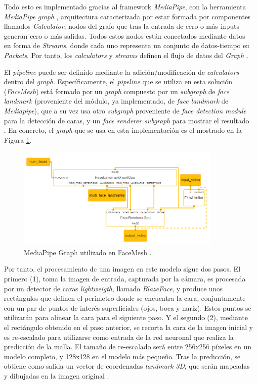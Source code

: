Todo esto es implementado gracias al framework \textit{MediaPipe}, con la herramienta \textit{MediaPipe graph} \cite{mediapipe}, arquitectura caracterizada por estar formada por componentes llamados \textit{Calculator}, nodos del grafo que tras la entrada de cero o más inputs generan cero o más salidas. Todos estos nodos están conectados mediante datos en forma de \textit{Streams}, donde cada uno representa un conjunto de datos-tiempo en \textit{Packets}. Por tanto, los \textit{calculators} y \textit{streams} definen el flujo de datos del \textit{Graph} \cite{mediapipe}.

El \textit{pipeline} puede ser definido mediante la adición/modificación de \textit{calculators} dentro del \textit{graph}. Específicamente, el \textit{pipeline} que se utiliza en esta solución (\textit{FaceMesh}) está formado por un \textit{graph} compuesto por un \textit{subgraph} de \textit{face landmark} (proveniente del módulo, ya implementado, de \textit{face landmark} de \textit{Mediapipe}), que a su vez usa otro \textit{subgraph} proveniente de \textit{face detection module} para la detección de caras, y un \textit{face renderer subgraph} para mostrar el resultado \cite{faceMesh}. En concreto, el \textit{graph} que se usa en esta implementación es el mostrado en la Figura \ref{fig:faceMesh}.

\begin{figure}[htp]
	\centering
	\includegraphics[width=10cm]{imagenes/faceMesh.png}
	\caption[MediaPipe Graph utilizado en FaceMesh.]{MediaPipe Graph utilizado en FaceMesh \cite{mpGraph}.}
	\label{fig:faceMesh}
\end{figure}

Por tanto, el procesamiento de una imagen en este modelo sigue dos pasos. El primero (1), toma la imagen de entrada, capturada por la cámara, es procesada por un detector de caras \textit{lightweigth}, llamado \textit{BlazeFace}, y produce unos rectángulos que definen el perímetro donde se encuentra la cara, conjuntamente con un par de puntos de interés superficiales (ojos, boca y nariz). Estos puntos se utilizarán para alinear la cara para el siguiente paso. Y el segundo (2), mediante el rectángulo obtenido en el paso anterior, se recorta la cara de la imagen inicial y es re-escalado para utilizarse como entrada de la red neuronal que realiza la predicción de la malla. El tamaño de re-escalado será entre 256x256 píxeles en un modelo completo, y 128x128 en el modelo más pequeño. Tras la predicción, se obtiene como salida un vector de coordenadas \textit{landmark 3D}, que serán mapeadas y dibujadas en la imagen original \cite{faceMesh2}. 

